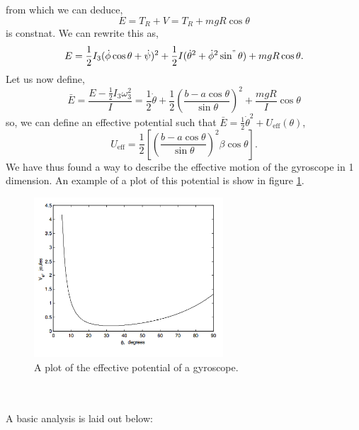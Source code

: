 \documentclass{book}
\begin{document}
from which we can deduce,
\begin{equation}
	E = T_R + V = T_R + mgR\cos\theta
\end{equation}
is constnat. We can rewrite this as,
\begin{equation}
	E = \frac{1}{2}I_3(\Dot{\phi}\cos\theta + \Dot{\psi})^2 + \frac{1}{2}I(\Dot{\theta}^2 + \Dot{\phi}^2 \sin^"\theta)+ mgR\cos\theta.
\end{equation}
Let us now define,
\begin{equation}
	\bar{E}= \frac{E - \frac{1}{2}I_3\omega_3^2}{I} = \frac{1}{2}\Dot{\theta} + \frac{1}{2}\left(\frac{b-a\cos\theta}{\sin\theta}\right)^2
 + \frac{mgR}{I}\cos\theta
 \end{equation}
so, we can define  an effective potential such that $\bar{E} = \frac{1}{2}\Dot{\theta}^2 + U_{\text{eff}}(\theta)$,
\begin{equation}
	U_{\text{eff}} = \frac{1}{2}\left[\left(\frac{b-a\cos\theta}{\sin\theta}\right)^2 \beta\cos\theta \right].
\end{equation}
We have thus found a way to describe the effective motion of the gyroscope in 1 dimension. An example of a plot of this potential is show in figure \ref{effpotgyro}.
\begin{figure}
	\centering
	\includegraphics[width=200pt]{FigureIV.32.png}
	\caption{A plot of the effective potential of a gyroscope.}
	\label{effpotgyro}
\end{figure}
\\\\
A basic analysis is laid out below:
\end{document}
